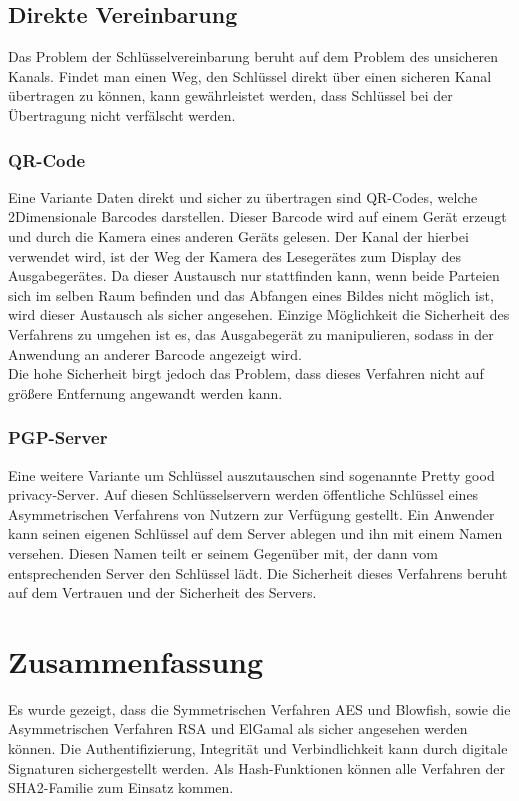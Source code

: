 \documentclass[10pt, a4paper,headsepline]{scrreprt}
\begin{document}
\subsection{Direkte Vereinbarung}
Das Problem der Schlüsselvereinbarung beruht auf dem Problem des unsicheren Kanals. Findet man einen Weg, den Schlüssel direkt über einen sicheren Kanal übertragen zu können, kann gewährleistet werden, dass Schlüssel bei der Übertragung nicht verfälscht werden.
\subsubsection{QR-Code}
Eine Variante Daten direkt und sicher zu übertragen sind QR-Codes, welche 2Dimensionale Barcodes darstellen. Dieser Barcode wird auf einem Gerät erzeugt und durch die Kamera eines anderen Geräts gelesen. Der Kanal der hierbei verwendet wird, ist der Weg der Kamera des Lesegerätes zum Display des Ausgabegerätes. Da dieser Austausch nur stattfinden kann, wenn beide Parteien sich im selben Raum befinden und das Abfangen eines Bildes nicht möglich ist, wird dieser Austausch als sicher angesehen. Einzige Möglichkeit die Sicherheit des Verfahrens zu umgehen ist es, das Ausgabegerät zu manipulieren, sodass in der Anwendung an anderer Barcode angezeigt wird. \\
Die hohe Sicherheit birgt jedoch das Problem, dass dieses Verfahren nicht auf größere Entfernung angewandt werden kann.

\subsubsection{PGP-Server}
Eine weitere Variante um Schlüssel auszutauschen sind sogenannte Pretty good privacy-Server. Auf diesen Schlüsselservern werden öffentliche Schlüssel eines Asymmetrischen Verfahrens von Nutzern zur Verfügung gestellt. Ein Anwender kann seinen eigenen Schlüssel auf dem Server ablegen und ihn mit einem Namen versehen. Diesen Namen teilt er seinem Gegenüber mit, der dann vom entsprechenden Server den Schlüssel lädt. Die Sicherheit dieses Verfahrens beruht auf dem Vertrauen und der Sicherheit des Servers.


\section {Zusammenfassung}
Es wurde gezeigt, dass die Symmetrischen Verfahren AES und Blowfish, sowie die Asymmetrischen Verfahren RSA und ElGamal als sicher angesehen werden können. Die Authentifizierung, Integrität und Verbindlichkeit kann durch digitale Signaturen sichergestellt werden. Als Hash-Funktionen können alle Verfahren der SHA2-Familie zum Einsatz kommen.
\end{document}
